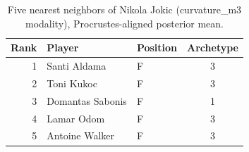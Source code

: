 \begin{table}[htbp]
  \centering\small
  \begin{tabular}{rllc}
    \toprule
    Rank & Player & Position & Archetype \\
    \midrule
    1 & Santi Aldama & F & 3 \\
    2 & Toni Kukoc & F & 3 \\
    3 & Domantas Sabonis & F & 1 \\
    4 & Lamar Odom & F & 3 \\
    5 & Antoine Walker & F & 3 \\
    \bottomrule
  \end{tabular}
  \caption{Five nearest neighbors of Nikola Jokic (curvature_m3 modality), Procrustes-aligned posterior mean.}
  \label{tab:Nikola_Jokic_neighbors_curvature_m3}
\end{table}

